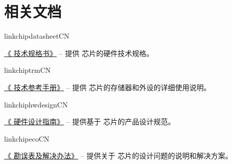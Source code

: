 
{%


\vspace{-0.5em}
\begin{minipage}{\textwidth}

\section*{相关文档}

\begin{itemize}
  \ifcsname linkchipdatasheetCN\endcsname%
    {%
      \item \href{\linkprefix\linkchipdatasheetCN}{《\chipseries{} 技术规格书》} --
        {\small 提供 \chipseries{} 芯片的硬件技术规格。}%
    }%
  \fi%

  \ifcsname linkchiptrmCN\endcsname%
    {%
      \item \href{\linkprefix\linkchiptrmCN}{《\chipseries{} 技术参考手册》} --
        {\small 提供 \chipseries{} 芯片的存储器和外设的详细使用说明。}%
    }%
  \fi%

  \ifcsname linkchiphwdesignCN\endcsname%
    {%
      \item \href{\linkprefix\linkchiphwdesignCN}{《\chipseries{} 硬件设计指南》} --
        {\small 提供基于 \chipseries{} 芯片的产品设计规范。}%
    }%
  \fi%

  \ifcsname linkchipecoCN\endcsname%
    \item \href{\linkprefix\linkchipecoCN}{《\chipseries{} 勘误表及解决办法》} --
        {\small 提供关于 \chipseries{} 芯片的设计问题的说明和解决方案。}
  \fi%
  

\end{itemize}
\end{minipage}}

